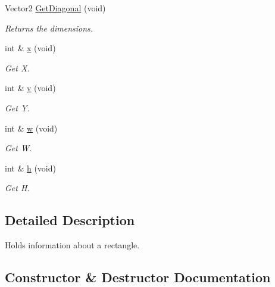\begin{DoxyCompactItemize}
Vector2 \mbox{\hyperlink{classinferno_1_1graphics_1_1_quad_ad7b1b10ee7f32e9486b41ae89cf0d71b}{Get\+Diagonal}} (void)
\begin{DoxyCompactList}\small\item\em Returns the dimensions. \end{DoxyCompactList}\item 
int \& \mbox{\hyperlink{classinferno_1_1graphics_1_1_quad_aed2540662e5f85e5ab467517dccaf90f}{x}} (void)
\begin{DoxyCompactList}\small\item\em Get X. \end{DoxyCompactList}\item 
int \& \mbox{\hyperlink{classinferno_1_1graphics_1_1_quad_af653ab1040d4647e88487287765f7404}{y}} (void)
\begin{DoxyCompactList}\small\item\em Get Y. \end{DoxyCompactList}\item 
int \& \mbox{\hyperlink{classinferno_1_1graphics_1_1_quad_a7670f2faa1d1b88bb8202d4efa968899}{w}} (void)
\begin{DoxyCompactList}\small\item\em Get W. \end{DoxyCompactList}\item 
int \& \mbox{\hyperlink{classinferno_1_1graphics_1_1_quad_af5653f4d125b24ac94ab8367e310e541}{h}} (void)
\begin{DoxyCompactList}\small\item\em Get H. \end{DoxyCompactList}\end{DoxyCompactItemize}


\subsection{Detailed Description}
Holds information about a rectangle. 



\subsection{Constructor \& Destructor Documentation}
\mbox{\label{classinferno_1_1graphics_1_1_quad_a2f73b62580d65d3eea736df1ffccbd1c}} 
